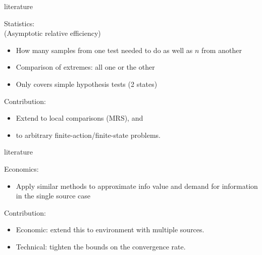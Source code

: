 \documentclass[square,]{gBakerBeamer}
\renewcommand{\|}{\,|\,}
\begin{document}
\begin{frame}{literature}

  Statistics:\\[1em]
  \cite{Chernoff1952} (Asymptotic relative efficiency)
  \begin{itemize}
    \item How many samples from one test needed to do as well as $n$ from another
    \item Comparison of extremes: all one or the other
    \item Only covers simple hypothesis tests (2 states)
  \end{itemize}\vspace{\baselineskip}\pause

  Contribution:
  \begin{itemize}
    \item<2->  Extend to local comparisons (MRS), and
    \item<2-> to arbitrary finite-action/finite-state problems.
  \end{itemize}



  \note{%

  }
\end{frame}


\begin{frame}{literature}

  Economics:\\[1em]
  \cite{Moscarini2002}
  \begin{itemize}
    \item Apply similar methods to approximate info value and demand for information in the single source case
  \end{itemize}\vspace{\baselineskip}
  Contribution:
  \begin{itemize}
    \item<2-> Economic: extend this to environment with multiple sources.
    \item<2-> \footnotesize Technical: tighten the bounds on the convergence rate.
  \end{itemize}

  \note{%

  }
\end{frame}
\end{document}
